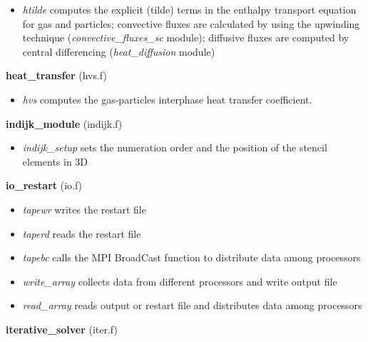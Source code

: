 \begin{itemize}
\item{\em htilde} computes the explicit (tilde) terms in the enthalpy transport equation for gas and particles; 
convective fluxes are calculated by using the upwinding technique ({\em convective\_fluxes\_sc} module); 
diffusive fluxes are computed by central differencing ({\em heat\_diffusion} module)\\
\end{itemize}
%
%
{\large{\bf heat\_transfer}} (hvs.f) \\
\begin{itemize}
\item{\em hvs} computes the gas-particles interphase heat transfer coefficient.
\end{itemize}
%
%
{\large{\bf indijk\_module}} (indijk.f) \\
\begin{itemize}
\item{\em indijk\_setup} sets the numeration order and the position of the stencil elements in 3D
\end{itemize}
%
%
%
%
{\large{\bf io\_restart}} (io.f)\\
\begin{itemize}
\item{\em tapewr} writes the restart file
\item{\em taperd} reads the restart file
\item{\em tapebc} calls the MPI BroadCast function to distribute data among processors
\item{\em write\_array} collects data from different processors and write output file
\item{\em read\_array}  reads output or restart file and distributes data among processors
\end{itemize}
%
%
{\large{\bf iterative\_solver}} (iter.f)\\[5mm]
